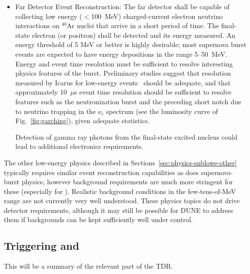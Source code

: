 \begin{itemize}
\item Far Detector Event Reconstruction:   
The far detector shall be capable of collecting low energy ($<$\SI{100}{\MeV})  charged-current electron neutrino interactions on $^{40}$Ar nuclei that arrive in a short period of time. The final-state electron (or positron) shall be detected and its energy measured.   An energy threshold of 5 MeV or better is highly desirable; most supernova burst events are expected to have energy depositions in the range 5--50~MeV.
Energy and event time resolution must be sufficient to resolve
interesting physics features of the burst.  Preliminary studies
suggest that resolution measured by Icarus for low-energy
events~\cite{Amoruso:2003sw} should be adequate, and that
approximately 10~$\mu$s event time resolution should be sufficient to resolve features such as the neutronization burst and the preceding short notch due to neutrino trapping in the $\nu_e$ spectrum (see the luminosity curve of Fig.~\ref{fig:garching}), given adequate statistics.   

Detection of gamma ray photons from the final-state excited nucleus could lead to additional electronics requirements.  

\end{itemize}



The other low-energy physics described in Sections~\ref{sec:physics-snblowe-other} typically requires similar event reconstruction capabilities as does supernova-burst physics; however background requirements are much more stringent for these (especially for ).  Realistic background conditions in the few-tens-of-MeV range are not currently  very well understood.  
These physics topics do not drive detector requirements, although it may still be possible for DUNE to address them if backgrounds can be kept sufficiently well under control.




\subsection{Triggering and }

This will be a summary of the relevant part of the TDR.


